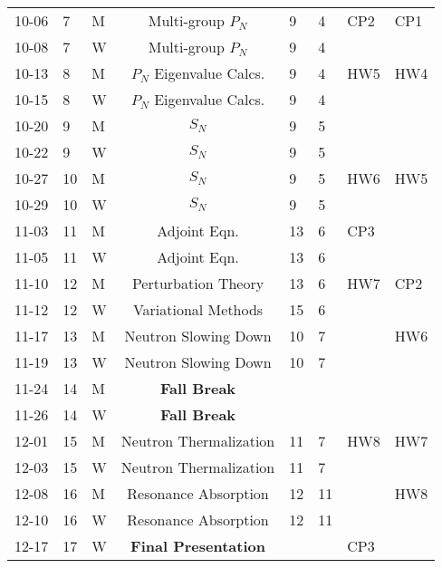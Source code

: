 \documentclass[11pt, a4paper]{article}
\begin{document}
\begin{table}[h]
\begin{center}
\begin{tabular}{lllcllll}
10-06 & 7 & M  & Multi-group $P_N$       & 9    & 4    & CP2 & CP1 \\
10-08 & 7 & W  & Multi-group $P_N$       & 9    & 4    &     &     \\
10-13 & 8 & M  & $P_N$ Eigenvalue Calcs. & 9    & 4    & HW5 & HW4 \\
10-15 & 8 & W  & $P_N$ Eigenvalue Calcs. & 9    & 4    &     &     \\
10-20 & 9 & M  & $S_N$                   & 9    & 5    &     &     \\
10-22 & 9 & W  & $S_N$                   & 9    & 5    &     &     \\
10-27 & 10 & M & $S_N$                   & 9    & 5    & HW6 & HW5 \\
10-29 & 10 & W & $S_N$                   & 9    & 5    &     &     \\
11-03 & 11 & M & Adjoint Eqn.            & 13   & 6    & CP3 &     \\
11-05 & 11 & W & Adjoint Eqn.            & 13   & 6    &     &     \\
11-10 & 12 & M & Perturbation Theory     & 13   & 6    & HW7 & CP2 \\
11-12 & 12 & W & Variational Methods     & 15   & 6    &     &     \\
11-17 & 13 & M & Neutron Slowing Down    & 10   & 7    &     & HW6 \\
11-19 & 13 & W & Neutron Slowing Down    & 10   & 7    &     &     \\
11-24 & 14 & M & \textbf{Fall Break}     &      &      &     &     \\
11-26 & 14 & W & \textbf{Fall Break}     &      &      &     &     \\
12-01 & 15 & M & Neutron Thermalization  & 11   & 7    & HW8 & HW7 \\
12-03 & 15 & W & Neutron Thermalization  & 11   & 7    &     &     \\
12-08 & 16 & M & Resonance Absorption    & 12   & 11   &     & HW8 \\
12-10 & 16 & W & Resonance Absorption    & 12   & 11   &     &     \\
12-17 & 17 & W & \textbf{Final Presentation} &  &      & CP3 &     \\
\end{tabular}
\end{center}
\end{table}
\end{document}
